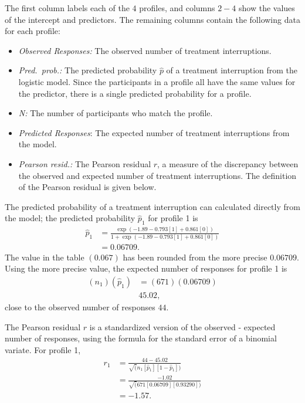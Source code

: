 The first column labels each of the $4$ profiles, and columns $2-4$ show the values of the intercept and predictors.  The remaining columns contain the following data for each profile:
\begin{itemize}

\item \textit{Observed Responses:} The observed number of treatment interruptions.

\item \textit{Pred.\ prob.:}  The predicted probability $\hat{p}$ of a treatment interruption from the logistic model.  Since the participants in a profile all have the same values for the predictor, there is a single predicted probability for a profile.

\item \textit{N:} The number of participants who match the profile.

\item \textit{Predicted Responses}: The expected number of treatment interruptions from the model.

\item \textit{Pearson resid.:}  The Pearson residual $r$, a measure of the discrepancy between the observed and expected number of treatment interruptions.  The definition of the Pearson residual is given below.

\end{itemize}

The predicted probability of a treatment interruption can calculated directly from the model; the predicted probability $\hat{p}_1$ for profile 1 is
\begin{align*}
     \hat{p}_1 &=   \frac{\exp(-1.89 - 0.793[1] + 0.861[0])}
       {1 + \exp(-1.89 - 0.793[1] + 0.861[0])} \\
       &= 0.06709.
\end{align*}
The value in the table $(0.067)$ has been rounded from the more precise $0.06709$.  Using the more precise value, the expected number of responses for profile 1 is
\begin{align*}
    (n_1)(\hat{p}_1) &= (671)(0.06709) \\
    & 45.02,
\end{align*}
close to the observed number of responses $44$.

The Pearson residual $r$ is a standardized version of the observed - expected number of responses, using the formula for the standard error of a binomial variate.  For profile 1,
\begin{align*}
   r_1 &=  \frac{44 - 45.02}{\sqrt(n_1[\hat{p}_1][1 - \hat{p}_1])} \\
       &= \frac{-1.02}{\sqrt(671[0.06709][0.93290])} \\
       &= -1.57.
\end{align*}

